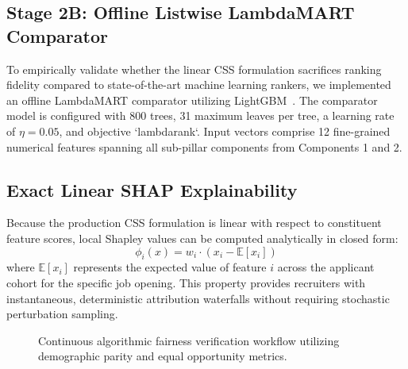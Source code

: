 \documentclass[conference]{IEEEtran}
\begin{document}
\subsection{Stage 2B: Offline Listwise LambdaMART Comparator}
To empirically validate whether the linear CSS formulation sacrifices ranking fidelity compared to state-of-the-art machine learning rankers, we implemented an offline LambdaMART comparator utilizing LightGBM~\cite{ke2017lightgbm}. The comparator model is configured with 800 trees, 31 maximum leaves per tree, a learning rate of $\eta = 0.05$, and objective `lambdarank`. Input vectors comprise 12 fine-grained numerical features spanning all sub-pillar components from Components 1 and 2.

\subsection{Exact Linear SHAP Explainability}
Because the production CSS formulation is linear with respect to constituent feature scores, local Shapley values can be computed analytically in closed form:
\begin{equation}
\phi_i(x) = w_i \cdot \left(x_i - \mathbb{E}[x_i]\right)
\end{equation}
where $\mathbb{E}[x_i]$ represents the expected value of feature $i$ across the applicant cohort for the specific job opening. This property provides recruiters with instantaneous, deterministic attribution waterfalls without requiring stochastic perturbation sampling.

\begin{figure}[t]
\centering
{}
\caption{Continuous algorithmic fairness verification workflow utilizing demographic parity and equal opportunity metrics.}
\label{fig:fairness_audit}
\end{figure}
\end{document}
